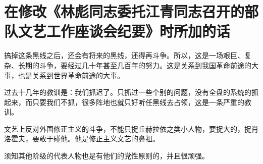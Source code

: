 \section[在修改《林彪同志委托江青同志召开的部队文艺工作座谈会纪要》时所加的话（一九六六年三月）]{在修改《林彪同志委托江青同志召开的部队文艺工作座谈会纪要》时所加的话}


搞掉这条黑线之后，还会有将来的黑线，还得再斗争。所以，这是一场艰巨、复杂、长期的斗争，要经过几十年甚至几百年的努力。这是关系到我国革命前途的大事，也是关系到世界革命前途的大事。

过去十几年的教训是：我们抓迟了。只抓过一些个别的问题，没有全盘的系统的抓起来，而只要我们不抓，很多阵地也就只好听任黑线去占领，这是一条严重的教训。

文艺上反对外国修正主义的斗争，不能只捉丘赫拉依之类小人物，要捉大的，捉肖洛霍夫，要敢于碰他。他是修正主义文艺的鼻祖。

须知其他阶级的代表人物也是有他们的党性原则的，并且很顽强。

